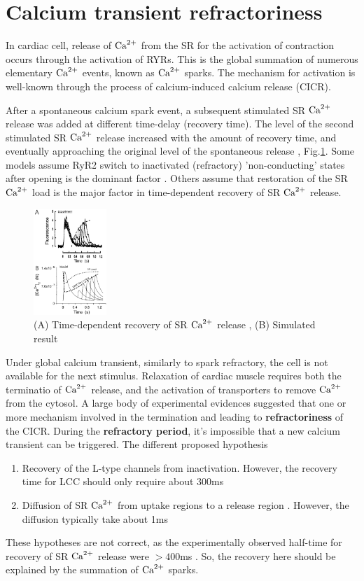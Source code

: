 \section{Calcium transient refractoriness}

In cardiac cell, release of ${\text{Ca}^{2+}}$ from the SR for the activation of
contraction occurs through the activation of RYRs. This is the global summation
of numerous elementary ${\text{Ca}^{2+}}$ events, known as ${\text{Ca}^{2+}}$ sparks. The mechanism for
activation is well-known through the process of calcium-induced calcium release
(CICR). 

After a spontaneous calcium spark event, a subsequent stimulated SR ${\text{Ca}^{2+}}$
release was added at different time-delay (recovery time). The level of the
second stimulated SR ${\text{Ca}^{2+}}$ release increased with the amount of recovery time,
and eventually approaching the original level of the spontaneous release
\citep{cheng1996csc}, Fig.\ref{fig:refractoriness_SRrelease}. Some models assume
RyR2 switch to inactivated (refractory) 'non-conducting' states after opening
is the dominant factor \citep{snyder2000mmc}. Others assume that restoration of
the SR ${\text{Ca}^{2+}}$ load is the major factor in time-dependent recovery of SR ${\text{Ca}^{2+}}$
release.

\begin{figure}[hbt]
 \centerline{\includegraphics[height=4cm,
 angle=0]{./images/refractoriness_SRrelease.eps}} 
 \caption{(A) Time-dependent recovery of SR ${\text{Ca}^{2+}}$ release \citep{cheng1996csc},
 (B) Simulated result \citep{snyder2000mmc}}
\label{fig:refractoriness_SRrelease}
\end{figure}

Under global calcium transient, similarly to spark refractory, the cell is not
available for the next stimulus. Relaxation of cardiac muscle requires both the
terminatio of ${\text{Ca}^{2+}}$ release, and the activation of transporters to remove ${\text{Ca}^{2+}}$
from the cytosol. A large body of experimental evidences suggested that one or
more mechanism involved in the termination and leading to {\bf refractoriness}
of the CICR.
During the {\bf refractory period}, it's impossible that a new calcium transient
can be triggered. The different proposed hypothesis
\begin{enumerate}
  \item Recovery of the L-type channels from inactivation. However, the recovery
  time for LCC should only require about 300ms \citep{mokelke1997}
  \item Diffusion of SR ${\text{Ca}^{2+}}$ from uptake regions to a release region
  \citep{bers1991ecc}. However, the diffusion typically take about 1ms
\end{enumerate}
These hypotheses are not correct, as the experimentally observed  half-time for
recovery of SR ${\text{Ca}^{2+}}$ release were $> 400$ms \citep{cheng1996csc}. So, the
recovery here should be explained by the summation of ${\text{Ca}^{2+}}$ sparks.


